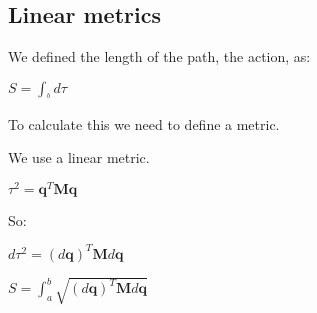 
\subsection{Linear metrics}

We defined the length of the path, the action, as:

\(S=\int_^b d\tau \)

To calculate this we need to define a metric.

We use a linear metric.

\(\tau^2 = \mathbf q^T\mathbf M\mathbf q\)

So:

\(d\tau^2 =(d\mathbf q)^T\mathbf Md\mathbf q \)

\(S = \int_a^b \sqrt {(d\mathbf q)^T\mathbf Md\mathbf q}\)

